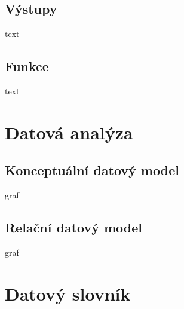 \documentclass[czech,12pt,a4paper,titlepage]{article}
\begin{document}
    \subsection*{Výstupy}
    text

    \subsection*{Funkce}
    text

    \clearpage


    \section{Datová analýza}\label{sec:datova-analyza}
    \subsection*{Konceptuální datový model}
    graf

    \subsection*{Relační datový model}
    \bigskip
    \bigskip
    \bigskip
    graf

    \clearpage

    \section*{Datový slovník}
    
\end{document}
